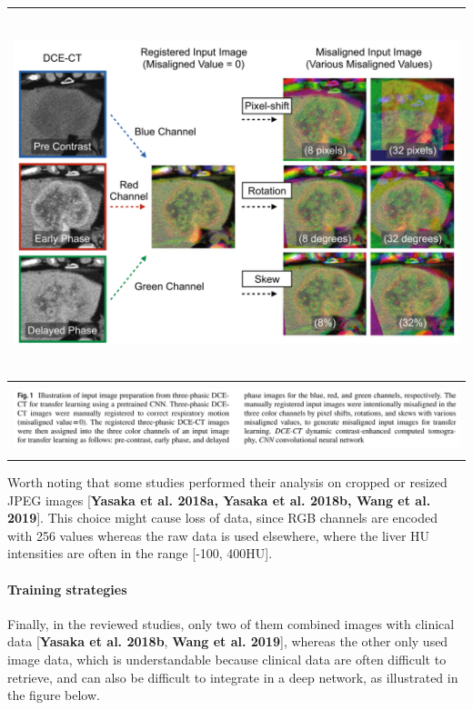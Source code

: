 \documentclass[]{article}
\let\oldparagraph\paragraph
\renewcommand{\paragraph}[1]{\oldparagraph{#1}\mbox{}}
\begin{document}
\begin{longtable}[c]{@{}l@{}}
\toprule
\includegraphics[width=6.11458in,height=4.15278in]{./images/image12.png}\tabularnewline
\midrule
\endhead
\includegraphics[width=6.11458in,height=0.79167in]{./images/image1.png}\tabularnewline
\bottomrule
\end{longtable}

Worth noting that some studies performed their analysis on cropped or
resized JPEG images {[}\textbf{Yasaka et al. 2018a, Yasaka et al. 2018b,
Wang et al. 2019}{]}. This choice might cause loss of data, since RGB
channels are encoded with 256 values whereas the raw data is used
elsewhere, where the liver HU intensities are often in the range
{[}-100, 400HU{]}.

\paragraph{Training strategies}\label{training-strategies}

Finally, in the reviewed studies, only two of them combined images with
clinical data {[}\textbf{Yasaka et al. 2018b}, \textbf{Wang et al.
2019}{]}, whereas the other only used image data, which is
understandable because clinical data are often difficult to retrieve,
and can also be difficult to integrate in a deep network, as illustrated
in the figure below.
\end{document}
